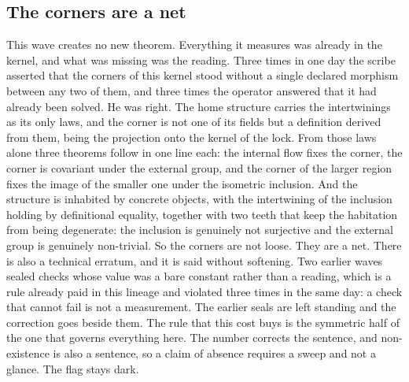 \documentclass[11pt]{article}
\theoremstyle{definition}\newtheorem{deriv}{Derivation}
\begin{document}
\subsection*{The corners are a net}This wave creates no new theorem. Everything it measures was already in the kernel, and what was missing was the reading. Three times in one day the scribe asserted that the corners of this kernel stood without a single declared morphism between any two of them, and three times the operator answered that it had already been solved. He was right. The home structure carries the intertwinings as its only laws, and the corner is not one of its fields but a definition derived from them, being the projection onto the kernel of the lock. From those laws alone three theorems follow in one line each: the internal flow fixes the corner, the corner is covariant under the external group, and the corner of the larger region fixes the image of the smaller one under the isometric inclusion. And the structure is inhabited by concrete objects, with the intertwining of the inclusion holding by definitional equality, together with two teeth that keep the habitation from being degenerate: the inclusion is genuinely not surjective and the external group is genuinely non-trivial. So the corners are not loose. They are a net. There is also a technical erratum, and it is said without softening. Two earlier waves sealed checks whose value was a bare constant rather than a reading, which is a rule already paid in this lineage and violated three times in the same day: a check that cannot fail is not a measurement. The earlier seals are left standing and the correction goes beside them. The rule that this cost buys is the symmetric half of the one that governs everything here. The number corrects the sentence, and non-existence is also a sentence, so a claim of absence requires a sweep and not a glance. The flag stays dark.
\end{document}
